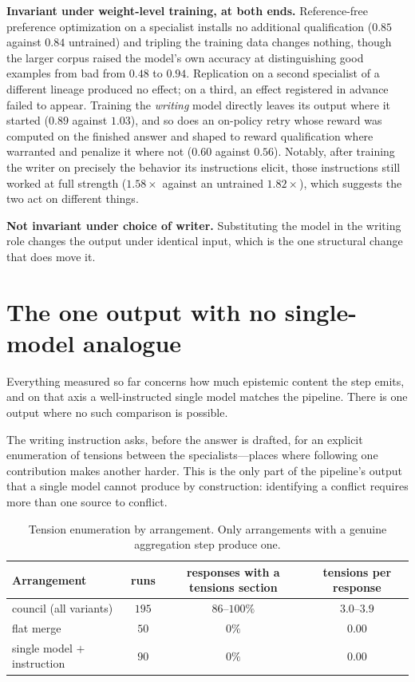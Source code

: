 \documentclass[11pt]{article}
\begin{document}
\textbf{Invariant under weight-level training, at both ends.} Reference-free
preference optimization on a specialist installs no additional qualification
($0.85$ against $0.84$ untrained) and tripling the training data changes
nothing, though the larger corpus raised the model's own accuracy at
distinguishing good examples from bad from $0.48$ to $0.94$. Replication on a
second specialist of a different lineage produced no effect; on a third, an
effect registered in advance failed to appear. Training the \emph{writing}
model directly leaves its output where it started ($0.89$ against $1.03$), and
so does an on-policy retry whose reward was computed on the finished answer and
shaped to reward qualification where warranted and penalize it where not
($0.60$ against $0.56$). Notably, after training the writer on precisely the
behavior its instructions elicit, those instructions still worked at full
strength ($1.58\times$ against an untrained $1.82\times$), which suggests the
two act on different things.

\textbf{Not invariant under choice of writer.} Substituting the model in the
writing role changes the output under identical input, which is the one
structural change that does move it.


\section{The one output with no single-model analogue}
\label{sec:tension}
Everything measured so far concerns how much epistemic content the step emits,
and on that axis a well-instructed single model matches the pipeline. There is
one output where no such comparison is possible.

The writing instruction asks, before the answer is drafted, for an explicit
enumeration of tensions between the specialists---places where following one
contribution makes another harder. This is the only part of the pipeline's
output that a single model cannot produce by construction: identifying a
conflict requires more than one source to conflict.

\begin{table}[t]
\centering
\caption{Tension enumeration by arrangement. Only arrangements with a genuine
aggregation step produce one.}
\label{tab:tension}
\begin{tabular}{lccc}
\toprule
Arrangement & runs & responses with a tensions section & tensions per response \\
\midrule
council (all variants) & $195$ & $86$--$100\%$ & $3.0$--$3.9$ \\
flat merge & $50$ & $0\%$ & $0.00$ \\
single model $+$ instruction & $90$ & $0\%$ & $0.00$ \\
\bottomrule
\end{tabular}
\end{table}
\end{document}
